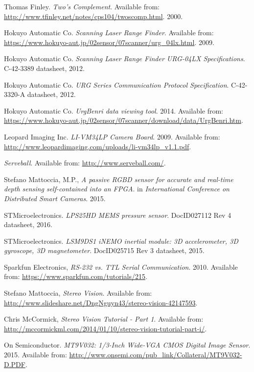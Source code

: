 \begin{thebibliography}{9}
Thomas Finley. \textit{Two's Complement}. Available from: \url{http://www.tfinley.net/notes/cps104/twoscomp.html}. 2000.

Hokuyo Automatic Co. \textit{Scanning Laser Range Finder}. Available from: \url{https://www.hokuyo-aut.jp/02sensor/07scanner/urg_04lx.html}. 2009.

Hokuyo Automatic Co. \textit{Scanning Laser Range Finder URG-04LX Specifications}. C-42-3389 datasheet, 2012.

Hokuyo Automatic Co. \textit{URG Series Communication Protocol Specification}. C-42-3320-A datasheet, 2012.

Hokuyo Automatic Co. \textit{UrgBenri data viewing tool}. 2014. Available from: \url{https://www.hokuyo-aut.jp/02sensor/07scanner/download/data/UrgBenri.htm}.

Leopard Imaging Inc.
\textit{LI-VM34LP Camera Board}. 2009.
Available from: \url{http://www.leopardimaging.com/uploads/li-vm34lp_v1.1.pdf}.

\textit{Serveball}.
Available from: \url{http://www.serveball.com/}.

Stefano Mattoccia, M.P.,
\textit{A passive RGBD sensor for accurate and real-time depth sensing self-contained into an FPGA}.
in \textit{International Conference on Distributed Smart Cameras}. 2015.

STMicroelectronics. \textit{LPS25HD MEMS pressure sensor}. DocID027112 Rev 4 datasheet, 2016.

STMicroelectronics. \textit{LSM9DS1 iNEMO inertial module: 3D accelerometer, 3D gyroscope, 3D magnetometer}. DocID025715 Rev 3 datasheet, 2015.

Sparkfun Electronics, \textit{RS-232 vs. TTL Serial Communication}. 2010. Available from: \url{https://www.sparkfun.com/tutorials/215}.

Stefano Mattoccia, \textit{Stereo Vision}. Available from: \url{http://www.slideshare.net/DngNguyn43/stereo-vision-42147593}.

Chris McCormick, \textit{Stereo Vision Tutorial  - Part 1}. Available from: \url{http://mccormickml.com/2014/01/10/stereo-vision-tutorial-part-i/}.

On Semiconductor. 
\textit{MT9V032: 1/3-Inch Wide-VGA CMOS Digital Image Sensor}. 2015. 
Available from: \url{http://www.onsemi.com/pub_link/Collateral/MT9V032-D.PDF}.


\end{thebibliography}
